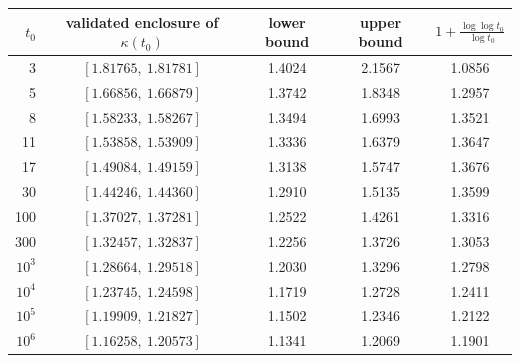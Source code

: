 \begin{tabular}{rcccc}
\toprule
$t_0$ & validated enclosure of $\kappa(t_0)$ & lower bound & upper bound & $1+\frac{\log\log t_0}{\log t_0}$\\
\midrule
3 & $[1.81765,\ 1.81781]$ & 1.4024 & 2.1567 & 1.0856\\
5 & $[1.66856,\ 1.66879]$ & 1.3742 & 1.8348 & 1.2957\\
8 & $[1.58233,\ 1.58267]$ & 1.3494 & 1.6993 & 1.3521\\
11 & $[1.53858,\ 1.53909]$ & 1.3336 & 1.6379 & 1.3647\\
17 & $[1.49084,\ 1.49159]$ & 1.3138 & 1.5747 & 1.3676\\
30 & $[1.44246,\ 1.44360]$ & 1.2910 & 1.5135 & 1.3599\\
100 & $[1.37027,\ 1.37281]$ & 1.2522 & 1.4261 & 1.3316\\
300 & $[1.32457,\ 1.32837]$ & 1.2256 & 1.3726 & 1.3053\\
$10^{3}$ & $[1.28664,\ 1.29518]$ & 1.2030 & 1.3296 & 1.2798\\
$10^{4}$ & $[1.23745,\ 1.24598]$ & 1.1719 & 1.2728 & 1.2411\\
$10^{5}$ & $[1.19909,\ 1.21827]$ & 1.1502 & 1.2346 & 1.2122\\
$10^{6}$ & $[1.16258,\ 1.20573]$ & 1.1341 & 1.2069 & 1.1901\\
\bottomrule
\end{tabular}
